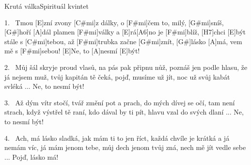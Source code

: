 \begin{song}{Krutá válka}{Spirituál kvintet}

\begin{xverse}{1.~}
Tmou [E]zní zvony [C#mi]z dálky, o [F#mi]{}čem to, milý, [G#mi]sníš,
[G#]hoří [A]dál plamen [F#mi]války a [E]rá[A6]no je [F#mi]blíž,
[H7]chci [E]být stále s [C#mi]tebou, až [F#mi]trubka začne [G#mi]znít,
[G#]lásko [A]má, vem mě s [F#mi]sebou! [E]Ne, to [A]nesmí [E]být!
\end{xverse}

\begin{xverse}{2.~}
Můj šál skryje proud vlasů, na pás pak připnu nůž,
poznáš jen podle hlasu, že já nejsem muž,
tvůj kapitán tě čeká, pojď, musíme už jít,
noc už svůj kabát svléká ... Ne, to nesmí být!
\end{xverse}

\begin{xverse}{3.~}
Až dým vítr stočí, tvář změní pot a prach,
do mých dívej se očí, tam není strach,
když výstřel tě raní, kdo dával by ti pít,
hlavu vzal do svých dlaní ... Ne, to nesmí být!
\end{xverse}

\begin{xverse}{4.~}
Ach, má lásko sladká, jak mám ti to jen říct,
každá chvíle je krátká a já nemám víc,
já mám jenom tebe, můj dech jenom tvůj zná,
nech mě jít vedle sebe ... Pojď, lásko má!
\end{xverse}

\end{song}
\chords{\chordASix}

